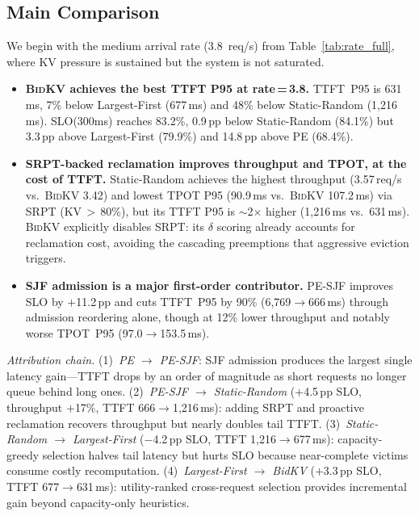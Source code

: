 \documentclass[conference]{IEEEtran}
\newcommand{\bidkv}{\textsc{BidKV}\xspace}
\newcommand{\qualdelta}{\ensuremath{\delta}}
\begin{document}
\subsection{Main Comparison}\label{sec:eval:main}

We begin with the medium arrival rate (3.8~req/s) from
Table~\ref{tab:rate_full}, where KV pressure is sustained but the system is
not saturated.

\begin{itemize}
\item \textbf{\bidkv achieves the best TTFT P95 at rate\,=\,3.8.}
  TTFT~P95 is 631\,ms, 7\% below Largest-First (677\,ms) and
  48\% below Static-Random (1{,}216\,ms).  SLO(300ms) reaches 83.2\%,
  0.9\,pp below Static-Random (84.1\%) but 3.3\,pp above Largest-First
  (79.9\%) and 14.8\,pp above PE (68.4\%).

\item \textbf{SRPT-backed reclamation improves throughput and TPOT, at the cost of TTFT.}
  Static-Random achieves the highest throughput (3.57\,req/s vs.\ \bidkv
  3.42) and lowest TPOT P95 (90.9\,ms vs.\ \bidkv 107.2\,ms) via SRPT
  (KV\,$>$\,80\%), but its TTFT P95 is ${\sim}$2$\times$ higher
  (1{,}216\,ms vs.\ 631\,ms).  \bidkv explicitly disables SRPT: its
  $\qualdelta$ scoring already accounts for reclamation cost, avoiding the
  cascading preemptions that aggressive eviction triggers.

\item \textbf{SJF admission is a major first-order contributor.}
  PE-SJF improves SLO by $+$11.2\,pp and cuts TTFT~P95 by 90\%
  (6{,}769$\to$666\,ms) through admission reordering alone, though at 12\%
  lower throughput and notably worse TPOT~P95 (97.0$\to$153.5\,ms).
\end{itemize}

\emph{Attribution chain.}
(1)~\emph{PE $\to$ PE-SJF}: SJF admission produces the largest single latency
  gain---TTFT drops by an order of magnitude as short requests no longer
  queue behind long ones.
(2)~\emph{PE-SJF $\to$ Static-Random} ($+$4.5\,pp SLO, throughput
  $+$17\%, TTFT 666$\to$1{,}216\,ms): adding SRPT and proactive reclamation
  recovers throughput but nearly doubles tail TTFT.
(3)~\emph{Static-Random $\to$ Largest-First} ($-$4.2\,pp SLO,
  TTFT 1{,}216$\to$677\,ms): capacity-greedy selection halves tail latency
  but hurts SLO because near-complete victims consume costly recomputation.
(4)~\emph{Largest-First $\to$ BidKV} ($+$3.3\,pp SLO,
  TTFT 677$\to$631\,ms): utility-ranked cross-request selection provides
  incremental gain beyond capacity-only heuristics.
\end{document}
